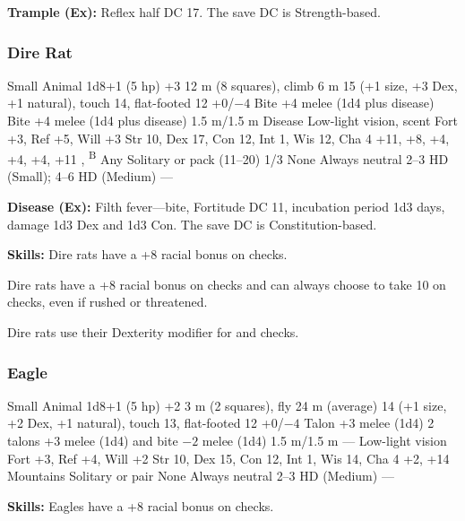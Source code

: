 \textbf{Trample (Ex):} Reflex half DC 17. The save DC is Strength-based.

\vskip3cm
\subsubsection{Dire Rat}
\begin{MonsterStats}
{Small Animal}
{1d8+1 (5 hp)}
{+3}
{12 m (8 squares), climb 6 m}
{15 (+1 size, +3 Dex, +1 natural), touch 14, flat-footed 12}
{+0/$-4$}
{Bite +4 melee (1d4 plus disease)}
{Bite +4 melee (1d4 plus disease)}
{1.5 m/1.5 m}
{Disease}
{Low-light vision, scent}
{Fort +3, Ref +5, Will +3}
{Str 10, Dex 17, Con 12, Int 1, Wis 12, Cha 4}
{ +11,  +8,  +4,  +4,  +4,  +11}
{, \textsuperscript{B}}
{Any}
{Solitary or pack (11--20)}
{1/3}
{None}
{Always neutral}
{2--3 HD (Small); 4--6 HD (Medium)}
{---}
\end{MonsterStats}

\textbf{Disease (Ex):} Filth fever---bite, Fortitude DC 11, incubation period 1d3 days, damage 1d3 Dex and 1d3 Con. The save DC is Constitution-based.

\textbf{Skills:} Dire rats have a +8 racial bonus on  checks.

Dire rats have a +8 racial bonus on  checks and can always choose to take 10 on  checks, even if rushed or threatened.

Dire rats use their Dexterity modifier for  and  checks.

\subsubsection{Eagle}
\begin{MonsterStats}
{Small Animal}
{1d8+1 (5 hp)}
{+2}
{3 m (2 squares), fly 24 m (average)}
{14 (+1 size, +2 Dex, +1 natural), touch 13, flat-footed 12}
{+0/$-4$}
{Talon +3 melee (1d4)}
{2 talons +3 melee (1d4) and bite $-2$ melee (1d4)}
{1.5 m/1.5 m}
{---}
{Low-light vision}
{Fort +3, Ref +4, Will +2}
{Str 10, Dex 15, Con 12, Int 1, Wis 14, Cha 4}
{ +2,  +14}
{}
{Mountains}
{Solitary or pair}
{\onehalf}
{None}
{Always neutral}
{2--3 HD (Medium)}
{---}
\end{MonsterStats}

\textbf{Skills:} Eagles have a +8 racial bonus on  checks.

